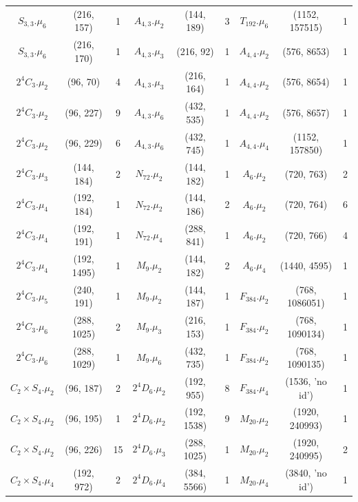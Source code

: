 {\begin{longtable}{ccc|ccc|ccc}
\rowcolor{lightgray}
$S_{3,3}.\mu_{6}$&(216, 157)&1 & $A_{4,3}.\mu_{2}$&(144, 189)&3 & $T_{192}.\mu_{6}$&(1152, 157515)&1\\
$S_{3,3}.\mu_{6}$&(216, 170)&1 & $A_{4,3}.\mu_{3}$&(216, 92)&1 & $A_{4,4}.\mu_{2}$&(576, 8653)&1\\
\rowcolor{lightgray}
$2^4C_3.\mu_{2}$&(96, 70)&4 & $A_{4,3}.\mu_{3}$&(216, 164)&1 & $A_{4,4}.\mu_{2}$&(576, 8654)&1\\
$2^4C_3.\mu_{2}$&(96, 227)&9 & $A_{4,3}.\mu_{6}$&(432, 535)&1 & $A_{4,4}.\mu_{2}$&(576, 8657)&1\\
\rowcolor{lightgray}
$2^4C_3.\mu_{2}$&(96, 229)&6 & $A_{4,3}.\mu_{6}$&(432, 745)&1 & $A_{4,4}.\mu_{4}$&(1152, 157850)&1\\
$2^4C_3.\mu_{3}$&(144, 184)&2 & $N_{72}.\mu_{2}$&(144, 182)&1 & $A_6.\mu_{2}$&(720, 763)&2\\
\rowcolor{lightgray}
$2^4C_3.\mu_{4}$&(192, 184)&1 & $N_{72}.\mu_{2}$&(144, 186)&2 & $A_6.\mu_{2}$&(720, 764)&6\\
$2^4C_3.\mu_{4}$&(192, 191)&1 & $N_{72}.\mu_{4}$&(288, 841)&1 & $A_6.\mu_{2}$&(720, 766)&4\\
\rowcolor{lightgray}
$2^4C_3.\mu_{4}$&(192, 1495)&1 & $M_9.\mu_{2}$&(144, 182)&2 & $A_6.\mu_{4}$&(1440, 4595)&1\\
$2^4C_3.\mu_{5}$&(240, 191)&1 & $M_9.\mu_{2}$&(144, 187)&1 & $F_{384}.\mu_{2}$&(768, 1086051)&1\\
\rowcolor{lightgray}
$2^4C_3.\mu_{6}$&(288, 1025)&2 & $M_9.\mu_{3}$&(216, 153)&1 & $F_{384}.\mu_{2}$&(768, 1090134)&1\\
$2^4C_3.\mu_{6}$&(288, 1029)&1 & $M_9.\mu_{6}$&(432, 735)&1 & $F_{384}.\mu_{2}$&(768, 1090135)&1\\
\rowcolor{lightgray}
$C_2 \times S_4.\mu_{2}$&(96, 187)&2 & $2^4D_6.\mu_{2}$&(192, 955)&8 & $F_{384}.\mu_{4}$&(1536, 'no id')&1\\
$C_2 \times S_4.\mu_{2}$&(96, 195)&1 & $2^4D_6.\mu_{2}$&(192, 1538)&9 & $M_{20}.\mu_{2}$&(1920, 240993)&1\\
\rowcolor{lightgray}
$C_2 \times S_4.\mu_{2}$&(96, 226)&15 & $2^4D_6.\mu_{3}$&(288, 1025)&1 & $M_{20}.\mu_{2}$&(1920, 240995)&2\\
$C_2 \times S_4.\mu_{4}$&(192, 972)&2 & $2^4D_6.\mu_{4}$&(384, 5566)&1 & $M_{20}.\mu_{4}$&(3840, 'no id')&1\\

\end{longtable}}
